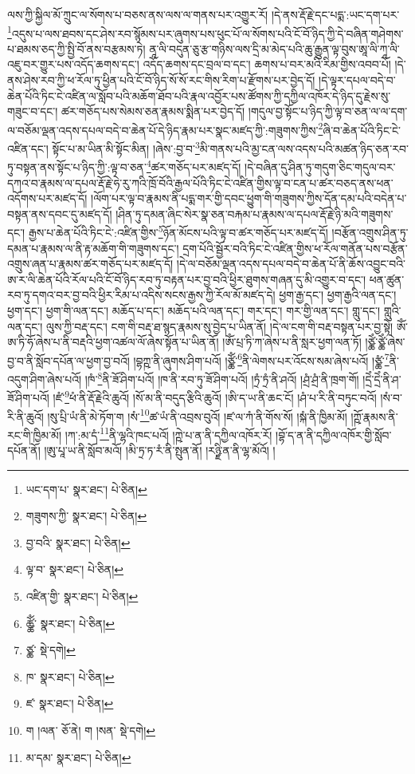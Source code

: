 ལས་ཀྱི་སྐྱིལ་མོ་ཀྲུང་ལ་སོགས་པ་བཅས་ནས་ལས་ལ་གནས་པར་འགྱུར་རོ། །དེ་ནས་རྡོ་རྗེ་དང་པདྨ་:ཡང་དག་པར་\footnote{ཡང་དག་པ་  སྣར་ཐང་།  པེ་ཅིན། }འདུས་པ་ལས་ཐབས་དང་ཤེས་རབ་སྙོམས་པར་ཞུགས་པས་ཕུང་པོ་ལ་སོགས་པའི་ངོ་བོ་ཉིད་ཀྱི་དེ་བཞིན་གཤེགས་པ་ཐམས་ཅད་ཀྱི་སྤྱི་བོ་ནས་བརྩམས་ཏེ། ནཱ་ལི་བདུན་ཅུ་རྩ་གཉིས་ལས་དྲི་མ་མེད་པའི་ཆུ་རྒྱུན་ལྟ་བུས་ཨཱ་ལི་ཀཱ་ལི་འཇུ་བར་གྱུར་པས་འདོད་ཆགས་དང་། འདོད་ཆགས་དང་བྲལ་བ་དང་། ཆགས་པ་བར་མའི་རིམ་གྱིས་འབབ་པོ། །དེ་ནས་ཤེས་རབ་ཀྱི་ཕ་རོལ་ཏུ་ཕྱིན་པའི་ངོ་བོ་ཉིད་སོ་སོ་རང་གིས་རིག་པ་རྫོགས་པར་བྱེད་དོ། །དེ་ལྟར་དཔལ་བདེ་བ་ཆེན་པོའི་ཏིང་ངེ་འཛིན་ལ་སློབ་པའི་མཆོག་ཐོབ་པའི་རྣལ་འབྱོར་པས་ཚོགས་ཀྱི་དཀྱིལ་འཁོར་དེ་ཉིད་དུ་རྗེས་སུ་གཟུང་བ་དང་། ཚར་གཅོད་པས་སེམས་ཅན་རྣམས་སྨིན་པར་བྱེད་དོ། །གདུལ་བྱ་སྟོང་པ་ཉིད་ཀྱི་ལྟ་བ་ཅན་ལ་ལ་དག་ལ་བཅོམ་ལྡན་འདས་དཔལ་བདེ་བ་ཆེན་པོ་དེ་ཉིད་རྣམ་པར་སྣང་མཛད་ཀྱི་:གཟུགས་ཀྱིས་\footnote{གཟུགས་ཀྱི་  སྣར་ཐང་།  པེ་ཅིན། }ཞི་བ་ཆེན་པོའི་ཏིང་ངེ་འཛིན་དང་། སྟོང་པ་མ་ཡིན་མི་སྟོང་མིན། །ཞེས་:བྱ་བ་\footnote{བྱ་བའི་  སྣར་ཐང་།  པེ་ཅིན། }མི་གནས་པའི་མྱ་ངན་ལས་འདས་པའི་མཚན་ཉིད་ཅན་རབ་ཏུ་བསྟན་ནས་སྟོང་པ་ཉིད་ཀྱི་:ལྟ་བ་ཅན་\footnote{ལྟ་བ་  སྣར་ཐང་།  པེ་ཅིན། }ཚར་གཅོད་པར་མཛད་དོ། །དེ་བཞིན་དུ་ཤིན་ཏུ་གདུག་ཅིང་གདུལ་བར་དཀའ་བ་རྣམས་ལ་དཔལ་རྡོ་རྗེ་ཧེ་རུ་ཀའི་ཁྲོ་བོའི་རྒྱལ་པོའི་ཏིང་ངེ་འཛིན་གྱིས་ལྟ་བ་ངན་པ་ཚར་བཅད་ནས་ཕན་འདོགས་པར་མཛད་དོ། །ལོག་པར་ལྟ་བ་རྣམས་ནི་པདྨ་གར་གྱི་དབང་ཕྱུག་གི་གཟུགས་ཀྱིས་དོན་དམ་པའི་བདེན་པ་བསྟན་ནས་དབང་དུ་མཛད་དོ། །ཤིན་ཏུ་དམན་ཞིང་སེར་སྣ་ཅན་བརྐམ་པ་རྣམས་ལ་དཔལ་རྡོ་རྗེ་ཉི་མའི་གཟུགས་དང་། རྒྱས་པ་ཆེན་པོའི་ཏིང་ངེ་:འཛིན་གྱིས་\footnote{འཛིན་གྱི་  སྣར་ཐང་།  པེ་ཅིན། }ཉོན་མོངས་པའི་ལྟ་བ་ཚར་གཅོད་པར་མཛད་དོ། །བརྩོན་འགྲུས་ཤིན་ཏུ་དམན་པ་རྣམས་ལ་ནི་རྟ་མཆོག་གི་གཟུགས་དང་། དྲག་པོའི་སྦྱོར་བའི་ཏིང་ངེ་འཛིན་གྱིས་ཕ་རོལ་གནོན་པས་བརྩོན་འགྲུས་ཞན་པ་རྣམས་ཚར་གཅོད་པར་མཛད་དོ། །དེ་ལ་བཅོམ་ལྡན་འདས་དཔལ་བདེ་བ་ཆེན་པོ་ནི་ཆོས་འབྱུང་བའི་ཨ་ར་ལི་ཆེན་པོའི་རོལ་པའི་ངོ་བོ་ཉིད་རབ་ཏུ་བརྟན་པར་བྱ་བའི་ཕྱིར་ཐུགས་གཞན་དུ་མི་འགྱུར་བ་དང་། ཕན་ཚུན་རབ་ཏུ་དགའ་བར་བྱ་བའི་ཕྱིར་རིམ་པ་འདིས་སངས་རྒྱས་ཀྱི་རོལ་མོ་མཛད་དེ། ཕྱག་རྒྱ་དང་། ཕྱག་རྒྱའི་ལན་དང་། ཕྱག་དང་། ཕྱག་གི་ལན་དང་། མཆོད་པ་དང་། མཆོད་པའི་ལན་དང་། གར་དང་། གར་གྱི་ལན་དང་། གླུ་དང་། གླུའི་ལན་དང་། ལུས་ཀྱི་བརྡ་དང་། ངག་གི་བརྡ་ཐ་སྙད་རྣམས་སུ་བྱེད་པ་ཡིན་ནོ། །དེ་ལ་ངག་གི་བརྡ་བསྟན་པར་བྱ་སྟེ། ཨོཾ་ཨ་ཏི་ཧོ་ཞེས་པ་ནི་བརྡའི་ཕྱག་འཚལ་ལོ་ཞེས་སྟོན་པ་ཡིན་ནོ། །ཨོཾ་པྲ་ཏི་ཀ་ཞེས་པ་ནི་སླར་ཕྱག་ལན་ཏོ། །ཙྪེཾ་ཙྪེཾ་ཞེས་བྱ་བ་ནི་སློབ་དཔོན་ལ་ཕྱག་བྱ་བའོ། །བྷཀྵ་ནི་ཞུགས་ཤིག་པའོ། །ཙྪོཾ་\footnote{ཚྪོཾ་  སྣར་ཐང་།  པེ་ཅིན། }ནི་ལེགས་པར་འོངས་སམ་ཞེས་པའོ། །ཙྪཾ་\footnote{ཙྪ་  སྡེ་དགེ། }ནི་འདུག་ཤིག་ཞེས་པའོ། །ཁཾ་\footnote{ཁ་  སྣར་ཐང་།  པེ་ཅིན། }ནི་ཟོ་ཤིག་པའོ། །ཁ་ནི་རབ་ཏུ་ཟོ་ཤིག་པའོ། །ཏྲཾ་ཏྲཾ་ནི་ཤའོ། །ཤྲཾ་ཤྲཾ་ནི་ཁྲག་གོ། །དྲེཾ་དྲེཾ་ནི་ཤ་ཟོ་ཤིག་པའོ། །ཛཾ་\footnote{ཛ་  སྣར་ཐང་།  པེ་ཅིན། }ཕཾ་ནི་རྡོ་རྗེའི་ཆུའོ། །སོ་མ་ནི་བདུད་རྩིའི་ཆུའོ། །ཨི་ད་ཡ་ནི་ཆང་ངོ། །ཤཾ་པ་རི་ནི་བཏུང་བའོ། །སཾ་བ་རི་ནི་ཆུའོ། །སུ་པྲི་ཡཾ་ནི་མེ་ཏོག་ག །སཾ་\footnote{ག །ལན་  ཅོ་ནེ། ག །སན་  སྡེ་དགེ། }ཚ་ཡཾ་ནི་འབྲས་བུའོ། །ཛ་ལ་ཀཾ་ནི་གོས་སོ། །སྐཾ་ནི་ཁྱིམ་མོ། །ཀྵོ་རྣམས་ནི་རང་གི་ཁྱིམ་མོ། །ཀ་:མ་དཾ་\footnote{མ་དམ་  སྣར་ཐང་།  པེ་ཅིན། }ནི་ལྷའི་ཁང་པའོ། །ཀྵེ་པ་ན་ནི་དཀྱིལ་འཁོར་རོ། །བྷོ་ད་ན་ནི་དཀྱིལ་འཁོར་གྱི་སློབ་དཔོན་ནོ། །ཨུ་པཱ་ཡ་ནི་སློབ་མའོ། །མི་ཏྲ་ཏ་རཾ་ནི་སྤུན་ནོ། །རཉྫི་ན་ནི་ལྷ་མོའོ། །

